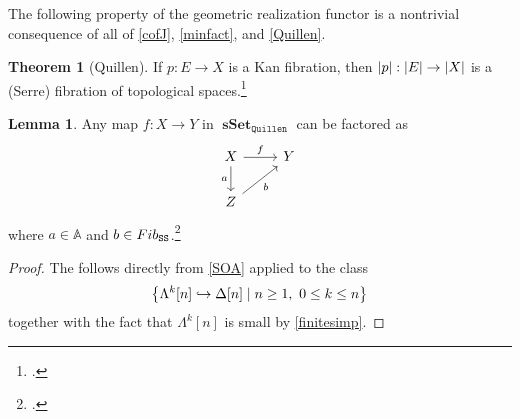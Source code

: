 \documentclass[10pt,letterpaper,cm]{nupset}
\theoremstyle{definition}
\theoremstyle{theorem}
\newtheorem{theorem}[definition]{Theorem}
\newtheorem{lemma}[definition]{Lemma}
\newtheorem{prop}[definition]{Proposition}
\theoremstyle{remark}
\newcommand{\0}{\mathbf{0}}
\newcommand{\1}{\mathbf{1}}
\newcommand{\2}{\mathbf{2}}
\DeclareMathOperator{\sset}{\mathbf{sSet}}
\DeclareMathOperator{\fib}{\mathnormal{Fib}}
\DeclareMathOperator{\cof}{\mathnormal{Cof}}
\begin{document}
\smallskip

The following property of the geometric realization functor is a nontrivial consequence of all of \cref{cofJ}, \cref{minfact}, and \cref{Quillen}.

\begin{theorem}[Quillen]\label{fibpres}
If $p : E \to X$ is a Kan fibration, then $\mleft\lvert{p}\mright\rvert : \mleft\lvert{E}\mright\rvert \to \mleft\lvert{X}\mright\rvert$ is a (Serre) fibration of topological spaces.\footnote{\cite[Theorem 10.10]{goerss}.}
\end{theorem}

\begin{comment}
\smallskip

\begin{prop}\label{RLPTB}
A map in $\sset_{\mathtt{Quillen}}$ has the right lifting property against $\cof$ if and only if it is a trivial fibration.
\end{lemma}
\begin{proof}
\textit{To appear.}
\end{proof}

\end{comment}

\medskip

\begin{lemma}\label{fact1}
Any map $f: X \to Y$ in $\sset_{\mathtt{Quillen}}$ can be factored as
\[
\begin{tikzcd}
X \arrow[r, "f"] \arrow[d, "a"'] & Y \\
Z \arrow[ru, "b"']          &  
\end{tikzcd}
\] where $a\in \mathbb{A}$ and $b \in \fib_{\mathtt{SS}}$.\footnote{\autocite[Theorem 3.1.1]{Joyal}.}
\end{lemma}
\begin{proof}
The follows directly from \cref{SOA} applied to the class  $$\mleft\{\Lambda^k[n] \hookrightarrow \Delta[n] \mid n \geq 1, \ 0\leq k \leq n\mright\}$$ together with the fact that $\Lambda^k[n]$ is small by \cref{finitesimp}.
\end{proof}
\end{document}

